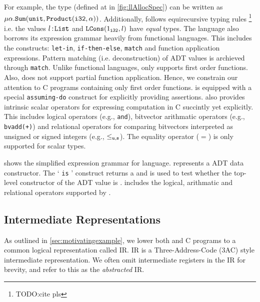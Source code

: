For example, the  type (defined at  in \cref{fig:llAllocSpec}) can be written
as $\mu \alpha. {\tt Sum}({\tt unit}, {\tt Product}({\tt i32},\alpha))$.
Additionally, \SpecL{} follows equirecursive typing rules \footnote{TODO:cite pls} i.e.
the values $l{{\,\tt :\!List}}$ and ${\tt LCons}(1_{\tt i32},l)$ have {\em equal} types.
The language also borrows its expression grammar heavily from functional languages.
This includes the constructs: {\tt let-in}, {\tt if-then-else}, {\tt match} and function application expressions.
Pattern matching (i.e. deconstruction) of ADT values is archieved through {\tt match}.
Unlike functional languages, \SpecL{} only supports first order functions.
Also, \SpecL{} does not support partial function application.
Hence, we constrain our attention to C programs containing only first order functions.
\SpecL{} is equipped with a special {\tt assuming-do} construct for explicitly providing assertions.
\SpecL{} also provides intrinsic scalar operators for expressing computation in C succintly yet explicitly.
This includes logical operators (e.g., {\tt and}), bitvector arithmatic operators (e.g., {\tt bvadd(+)}) and
relational operators for comparing bitvectors interpreted as unsigned or signed integers (e.g., {\tt $\leq_{\tt u,s}$}).
The equality operator ($=$) is only supported for scalar types.



 shows the simplified expression grammar for \SpecL{} language.
 represents a ADT data constructor.
The ` {\tt is} ' construct returns a  and is used to test whether the top-level constructor
of the ADT value  is .
 includes the logical, arithmatic and relational operators supported by \SpecL{}.

\subsection{Intermediate Representations}
\label{sec:ir}
As outlined in \cref{sec:motivatingexample}, we lower both \SpecL{} and C programs to a common
logical representation called IR.
IR is a Three-Address-Code (3AC) style intermediate representation.
We often omit intermediate registers in the IR for brevity,
and refer to this as the {\em abstracted} IR.




